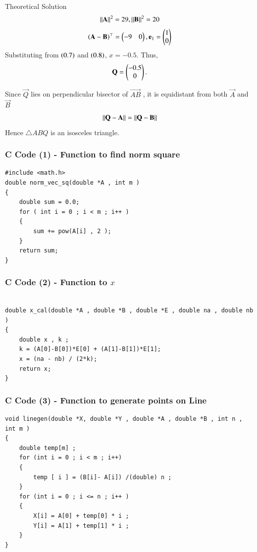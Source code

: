 \documentclass{beamer}
\begin{document}
\begin{frame}{Theoretical Solution}
\begin{align}
      \left\lVert\mathbf{A}\right\rVert^2 = 29 , \left\lVert\mathbf{B}\right\rVert^2 = 20   
  \end{align}
    \begin{align}
        \left(\mathbf{A}-\mathbf{B}\right)^{\top} = \begin{pmatrix}-9 & 0 \end{pmatrix} , \mathbf{e}_1 = \begin{pmatrix}1 \\ 0\end{pmatrix} 
    \end{align}
    Substituting from $\left(0.7\right)$ and $\left(0.8\right)$,
 $x =  -0.5$.  Thus, 
		\begin{align}
        \mathbf{Q} = \begin{pmatrix}-0.5 \\ 0\end{pmatrix}.
		\end{align}
		
Since $\vec{Q}$ lies on perpendicular bisector of $\vec{AB}$ , it is equidistant from both $\vec{A}$ and $\vec{B}$
\begin{align}
    \left\lVert\mathbf{Q} - \mathbf{A}\right\rVert = \left\lVert\mathbf{Q} - \mathbf{B}\right\rVert
\end{align}
Hence $\triangle ABQ$ is an isosceles triangle.
\end{frame}

\begin{frame}[fragile]
    \frametitle{C Code (1) - Function to find norm square }
    \begin{lstlisting}  
#include <math.h>
double norm_vec_sq(double *A , int m )
{
    double sum = 0.0; 
    for ( int i = 0 ; i < m ; i++ )
    {
        sum += pow(A[i] , 2 );
    }
    return sum; 
}
    \end{lstlisting}
\end{frame}



\begin{frame}[fragile]
    \frametitle{C Code (2) - Function to $x$}
    \begin{lstlisting}

double x_cal(double *A , double *B , double *E , double na , double nb  )
{
    double x , k ; 
    k = (A[0]-B[0])*E[0] + (A[1]-B[1])*E[1];  
    x = (na - nb) / (2*k);
    return x; 
}
    \end{lstlisting}
\end{frame}



\begin{frame}[fragile]
    \frametitle{C Code (3) - Function to generate points on Line }
    \begin{lstlisting}
void linegen(double *X, double *Y , double *A , double *B , int n , int m )
{
    double temp[m] ; 
    for (int i = 0 ; i < m ; i++)
    {
        temp [ i ] = (B[i]- A[i]) /(double) n ; 
    }
    for (int i = 0 ; i <= n ; i++ )
    {
        X[i] = A[0] + temp[0] * i ; 
        Y[i] = A[1] + temp[1] * i ;
    }
}

\end{lstlisting}
\end{frame}
\end{document}
